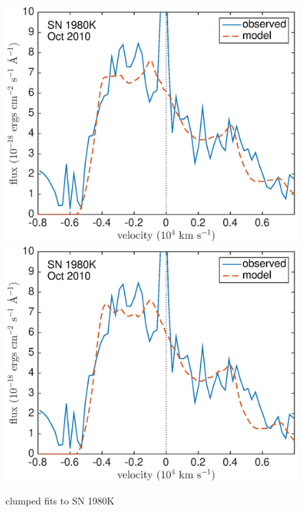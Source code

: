 \begin{figure}
\includegraphics[scale=0.4,clip=true, trim=20 0 40 20]{chapters/chapter6/figs/80K/clumped/OI}
\includegraphics[scale=0.4,clip=true, trim=20 0 40 20]{chapters/chapter6/figs/80K/clumped/OI_amC}
\caption{clumped fits to SN 1980K}
\label{80K_clumped}
\end{figure}

\clearpage

